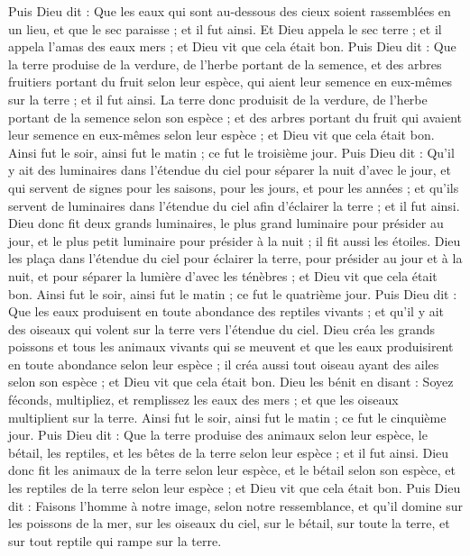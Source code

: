 \begin{multicols}{2}
Puis Dieu dit : Que les eaux qui sont au-dessous des cieux soient rassemblées en un lieu, et que le sec paraisse ; et il fut ainsi.
Et Dieu appela le sec terre ; et il appela l'amas des eaux mers ; et Dieu vit que cela était bon.
Puis Dieu dit : Que la terre produise de la verdure, de l'herbe portant de la semence, et des arbres fruitiers portant du fruit selon leur espèce, qui aient leur semence en eux-mêmes sur la terre ; et il fut ainsi.
La terre donc produisit de la verdure, de l'herbe portant de la semence selon son espèce ; et des arbres portant du fruit qui avaient leur semence en eux-mêmes selon leur espèce ; et Dieu vit que cela était bon.
Ainsi fut le soir, ainsi fut le matin ; ce fut le troisième jour.
Puis Dieu dit : Qu'il y ait des luminaires dans l'étendue du ciel pour séparer la nuit d'avec le jour, et qui servent de signes pour les saisons, pour les jours, et pour les années ;
et qu’ils servent de luminaires dans l'étendue du ciel afin d'éclairer la terre ; et il fut ainsi.
Dieu donc fit deux grands luminaires, le plus grand luminaire pour présider au jour, et le plus petit luminaire pour présider à la nuit ; il fit aussi les étoiles.
Dieu les plaça dans l'étendue du ciel pour éclairer la terre,
pour présider au jour et à la nuit, et pour séparer la lumière d’avec les ténèbres ; et Dieu vit que cela était bon.
Ainsi fut le soir, ainsi fut le matin ; ce fut le quatrième jour.
Puis Dieu dit : Que les eaux produisent en toute abondance des reptiles vivants ; et qu'il y ait des oiseaux qui volent sur la terre vers l'étendue du ciel.
Dieu créa les grands poissons et tous les animaux vivants qui se meuvent et que les eaux produisirent en toute abondance selon leur espèce ; il créa aussi tout oiseau ayant des ailes selon son espèce ; et Dieu vit que cela était bon.
Dieu les bénit en disant : Soyez féconds, multipliez, et remplissez les eaux des mers ; et que les oiseaux multiplient sur la terre.
Ainsi fut le soir, ainsi fut le matin ; ce fut le cinquième jour.
Puis Dieu dit : Que la terre produise des animaux selon leur espèce, le bétail, les reptiles, et les bêtes de la terre selon leur espèce ; et il fut ainsi.
Dieu donc fit les animaux de la terre selon leur espèce, et le bétail selon son espèce, et les reptiles de la terre selon leur espèce ; et Dieu vit que cela était bon.
Puis Dieu dit : Faisons l'homme à notre image, selon notre ressemblance, et qu'il domine sur les poissons de la mer, sur les oiseaux du ciel, sur le bétail, sur toute la terre, et sur tout reptile qui rampe sur la terre.

\end{multicols}
